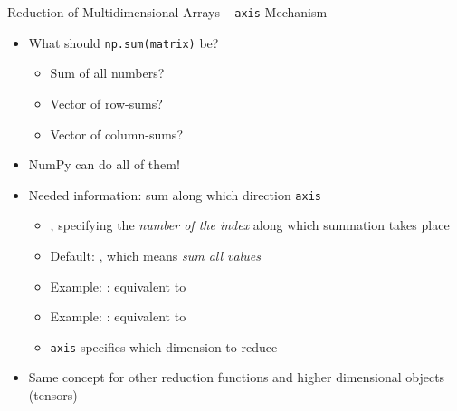
\begin{frame}[fragile]{Reduction of Multidimensional Arrays -- \texttt{axis}-Mechanism}
%
\begin{itemize}
\item What should \texttt{np.sum(matrix)} be?
	\begin{itemize}
	\item Sum of all numbers?
	\item Vector of row-sums?
	\item Vector of column-sums?
	\end{itemize}
\item NumPy can do all of them!
\item Needed information: sum along which direction \Thus \texttt{axis}
	\begin{itemize}
	\item {}, specifying the \emph{number of the index} along which summation takes place
	\item Default: , which means \emph{sum all values}
	\item Example: : equivalent to 
	\item Example: : equivalent to 
	\item[\Thus] \texttt{axis} specifies which dimension to reduce
	\end{itemize}
\item Same concept for other reduction functions and higher dimensional objects (tensors)
\end{itemize}
%
\end{frame}


